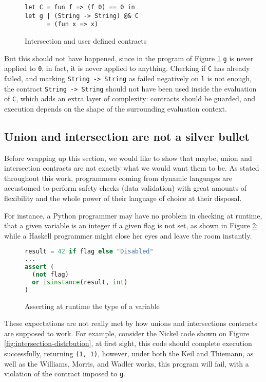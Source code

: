 \documentclass[sigplan,10pt,review,anonymous]{acmart}
\newcommand{\nickel}[1]{\lstinline[language=nickel]{#1}}
\begin{document}
\begin{figure}[h]
\begin{lstlisting}[language=nickel]
let C = fun f => (f 0) == 0 in
let g | (String -> String) @& C
      = (fun x => x) 
\end{lstlisting}
\caption{Intersection and user defined contracts}
\label{fig:inter-flat-contracts}
\end{figure}

But this should not have happened, since in the program of Figure \ref{fig:inter-flat-contracts}
\nickel{g} is never applied to \nickel{0}, in fact, it is never applied
to anything.
Checking if \nickel{C} has already failed, and marking \nickel{String -> String} as
failed negatively on \nickel{l} is not enough, the contract \nickel{String -> String}
should not have been used inside the evaluation of \nickel{C}, which
adds an extra layer of complexity: contracts should be guarded, and execution
depends on the shape of the surrounding evaluation context.

\subsection*{Union and intersection are not a silver bullet}

Before wrapping up this section, we would like to show that maybe, union and intersection
contracts are not exactly what we would want them to be.
As stated throughout this work, programmers coming from dynamic languages
are accustomed to perform safety checks (data validation) with
great amounts of flexibility and the whole power of their
language of choice at their disposal.

For instance, a Python programmer may have no problem in checking
at runtime, that a given variable is an integer if a given flag is
not set, as shown in Figure \ref{fig:python-assertion};
while a Haskell programmer might close her eyes and leave the room
instantly.

\begin{figure}[h]
\begin{lstlisting}[language=python]
result = 42 if flag else "Disabled"
...
assert (
  (not flag) 
  or isinstance(result, int)
)
\end{lstlisting}
\caption{Asserting at runtime the type of a variable}
\label{fig:python-assertion}
\end{figure}

These expectations are not really met by how unions and intersections
contracts are supposed to work.
For example, consider the Nickel code shown on Figure
\ref{fig:intersection-distrbution}, at first sight, this code should
complete execution successfully, returning \nickel{(1, 1)},
however, under both the Keil and Thiemann, as well as the
Williams, Morris, and Wadler works, this program will fail, with a violation
of the contract imposed to \nickel{g}.
\end{document}

